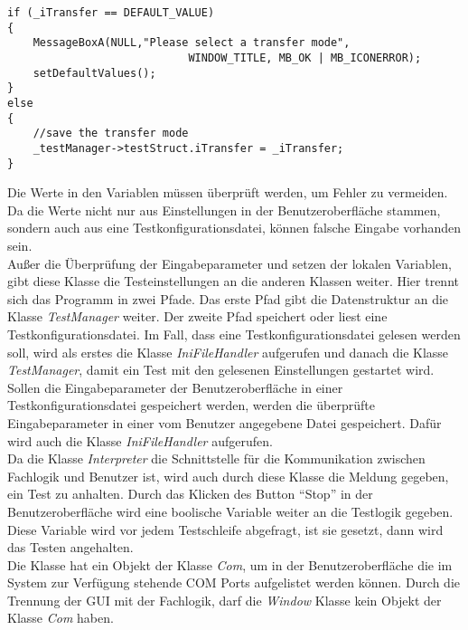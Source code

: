 \begin{lstlisting}	 
if (_iTransfer == DEFAULT_VALUE)
{
	MessageBoxA(NULL,"Please select a transfer mode",
							WINDOW_TITLE, MB_OK | MB_ICONERROR);
	setDefaultValues();
}
else
{
	//save the transfer mode
	_testManager->testStruct.iTransfer = _iTransfer;
}
\end{lstlisting}

Die Werte in den Variablen müssen überprüft werden, um Fehler zu vermeiden. Da die Werte nicht nur aus Einstellungen in der Benutzeroberfläche stammen, sondern auch aus eine Testkonfigurationsdatei, können falsche Eingabe vorhanden sein.\\

Außer die Überprüfung der Eingabeparameter und setzen der lokalen Variablen, gibt diese Klasse die Testeinstellungen an die anderen Klassen weiter. Hier trennt sich das Programm in zwei Pfade. Das erste Pfad gibt die Datenstruktur an die Klasse \textit{TestManager} weiter. Der zweite Pfad speichert oder liest eine Testkonfigurationsdatei. Im Fall, dass eine Testkonfigurationsdatei gelesen werden soll, wird als erstes die Klasse \textit{IniFileHandler} aufgerufen und danach die Klasse \textit{TestManager}, damit ein Test mit den gelesenen Einstellungen gestartet wird. Sollen die Eingabeparameter der Benutzeroberfläche in einer Testkonfigurationsdatei gespeichert werden, werden die überprüfte Eingabeparameter in einer vom Benutzer angegebene Datei gespeichert. Dafür wird auch die Klasse \textit{IniFileHandler} aufgerufen.\\

Da die Klasse \textit{Interpreter} die Schnittstelle für die Kommunikation zwischen Fachlogik und Benutzer ist, wird auch durch diese Klasse die Meldung gegeben, ein Test zu anhalten. Durch das Klicken des Button "`Stop"' in der Benutzeroberfläche wird eine boolische Variable weiter an die Testlogik gegeben. Diese Variable wird vor jedem Testschleife abgefragt, ist sie gesetzt, dann wird das Testen angehalten.\\

Die Klasse hat ein Objekt der Klasse \textit{Com}, um in der Benutzeroberfläche die im System zur Verfügung stehende COM Ports aufgelistet werden können. Durch die Trennung der GUI mit der Fachlogik, darf die \textit{Window} Klasse kein Objekt der Klasse \textit{Com} haben.\\



\newpage

